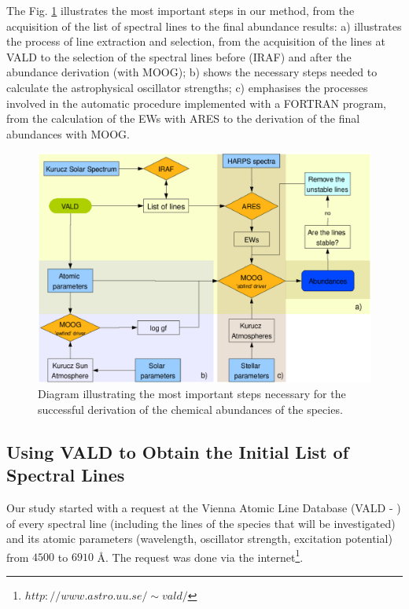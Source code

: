 \documentclass[dvips,12pt,a4paper]{report}
\begin{document}
{The Fig. \ref{esquema} illustrates the most important steps in our method, from the acquisition of the list of spectral lines to the final abundance results: a) illustrates the process of line extraction and selection, from the acquisition of the lines at VALD to the selection of the spectral lines before (IRAF) and after the abundance derivation (with MOOG); b) shows the necessary steps needed to calculate the astrophysical oscillator strengths; c) emphasises the processes involved in the automatic procedure implemented with a FORTRAN program, from the calculation of the EWs with ARES to the derivation of the final abundances with MOOG.

\begin{figure}[h]
\centering
\includegraphics[width= 12 cm]{pics/parte3/esquemav3.eps}
\caption{Diagram illustrating the most important steps necessary for the successful derivation of the chemical abundances of the species.}
\label{esquema}
\end{figure}



\subsection {Using VALD to Obtain the Initial List of Spectral Lines}
\label{VALD}
Our study started with a request at the Vienna Atomic Line Database (VALD - \citeauthor{Kupka-1999} \citeyear{Kupka-1999})  of every spectral line (including the lines of the species that will be investigated) and its atomic parameters (wavelength, oscillator strength, excitation potential) %
from $4500$ to $6910$ \AA. The request was done via the internet\footnote{$http://www.astro.uu.se/\sim vald/$}. %

}
\end{document}
